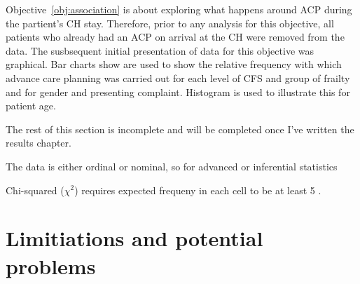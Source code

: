 \documentclass
[
	12pt,
	a4paper,
	oneside,
]{report}
\begin{document}
Objective~\ref{obj:association} is about exploring what happens around ACP
during the partient's CH stay. Therefore, prior to any analysis for this 
objective, all patients who already had an ACP on arrival at the CH were
removed from the data.
The susbsequent initial presentation of data for this objective was
graphical. Bar charts show are used to show the relative frequency with which 
advance care planning
was carried out for each level of CFS and group of frailty and for gender and
presenting complaint. Histogram is used to illustrate this for patient age.

The rest of this section is incomplete and will be completed once I've written
the results chapter.

The data is either ordinal or nominal, so for advanced or inferential 
statistics 

%
%

%
%

%
%

Chi-squared ($\chi^2$) requires expected frequeny in each cell to be at least 5 
\parencite[page 690]{field:09}.

% 
%

\section{Limitiations and potential problems}
\end{document}
